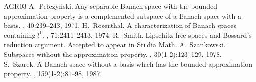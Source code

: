 \documentclass[letterpaper]{amsart}
\numberwithin{equation}{section}
\theoremstyle{definition}
\begin{document}
\begin{thebibliography}{AGR03}
A.~Pe{\l}czy\'nski.
\newblock Any separable {B}anach space with the bounded approximation property
is a complemented subspace of a {B}anach space with a basis.
, 40:239--243, 1971.
H.~Rosenthal.
\newblock A characterization of {B}anach spaces containing {$l^{1}$}.
, 71:2411--2413, 1974.
R.~Smith.
\newblock Lipschitz-free spaces and {B}ossard's reduction argument. Accepted to appear in Studia Math. 
A.~Szankowski.
\newblock Subspaces without the approximation property.
, 30(1-2):123--129, 1978.
S.~Szarek.
\newblock A {B}anach space without a basis which has the bounded approximation
property.
, 159(1-2):81--98, 1987.\end{thebibliography}
\end{document}
